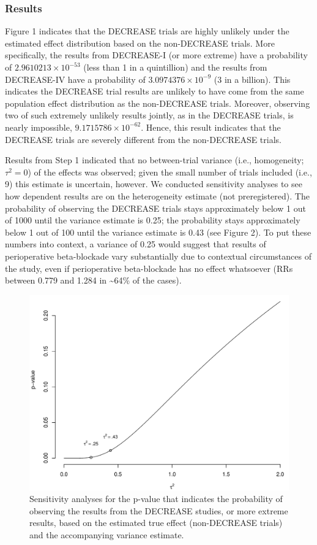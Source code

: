 \documentclass[]{article}
\begin{document}
\subsubsection{Results}\label{results-1}

Figure 1 indicates that the DECREASE trials are highly unlikely under
the estimated effect distribution based on the non-DECREASE trials. More
specifically, the results from DECREASE-I (or more extreme) have a
probability of \(2.9610213\times 10^{-53}\) (less than 1 in a
quintillion) and the results from DECREASE-IV have a probability of
\(3.0974376\times 10^{-9}\) (3 in a billion). This indicates the
DECREASE trial results are unlikely to have come from the same
population effect distribution as the non-DECREASE trials. Moreover,
observing two of such extremely unlikely results jointly, as in the
DECREASE trials, is nearly impossible, \(9.1715786\times 10^{-62}\).
Hence, this result indicates that the DECREASE trials are severely
different from the non-DECREASE trials.

Results from Step 1 indicated that no between-trial variance (i.e.,
homogeneity; \(\tau^2=0\)) of the effects was observed; given the small
number of trials included (i.e., 9) this estimate is uncertain, however.
We conducted sensitivity analyses to see how dependent results are on
the heterogeneity estimate (not preregistered). The probability of
observing the DECREASE trials stays approximately below 1 out of 1000
until the variance estimate is 0.25; the probability stays approximately
below 1 out of 100 until the variance estimate is 0.43 (see Figure 2).
To put these numbers into context, a variance of 0.25 would suggest that
results of perioperative beta-blockade vary substantially due to
contextual circumstances of the study, even if perioperative
beta-blockade has no effect whatsoever (RRs between 0.779 and 1.284 in
\textasciitilde{}64\% of the cases).

\begin{figure}

{\centering \includegraphics[width=0.8\linewidth]{../figures/fig2} 

}

\caption{Sensitivity analyses for the p-value that indicates the probability of observing the results from the DECREASE studies, or more extreme results, based on the estimated true effect (non-DECREASE trials) and the accompanying variance estimate.}\label{fig:figure 2}
\end{figure}
\end{document}
